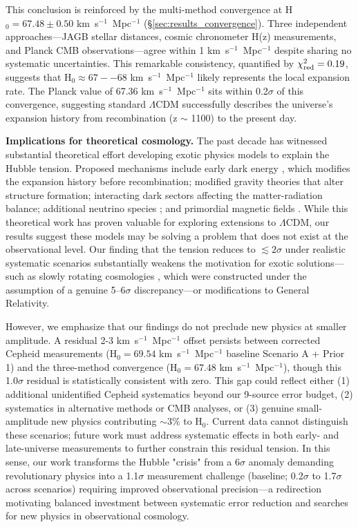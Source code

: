 \documentclass[preprint, linenumbers]{aastex701}
\begin{document}
This conclusion is reinforced by the multi-method convergence at H$_0 = 67.48 \pm 0.50$ km~s$^{-1}$~Mpc$^{-1}$ (\S\ref{sec:results_convergence}). Three independent approaches---JAGB stellar distances, cosmic chronometer H(z) measurements, and Planck CMB observations---agree within 1 km~s$^{-1}$~Mpc$^{-1}$ despite sharing no systematic uncertainties. This remarkable consistency, quantified by $\chi^2_{\rm red} = 0.19$, suggests that H$_0 \approx 67--68$ km~s$^{-1}$~Mpc$^{-1}$ likely represents the local expansion rate. The Planck value of 67.36 km~s$^{-1}$~Mpc$^{-1}$ sits within 0.2$\sigma$ of this convergence, suggesting standard $\Lambda$CDM successfully describes the universe's expansion history from recombination (z $\sim$ 1100) to the present day.

\textbf{Implications for theoretical cosmology.} The past decade has witnessed substantial theoretical effort developing exotic physics models to explain the Hubble tension. Proposed mechanisms include early dark energy \citep{Poulin2019}, which modifies the expansion history before recombination; modified gravity theories \citep{Marra2021} that alter structure formation; interacting dark sectors \citep{DiValentino2020} affecting the matter-radiation balance; additional neutrino species \citep{Anchordoqui2022}; and primordial magnetic fields \citep{Jedamzik2020}. While this theoretical work has proven valuable for exploring extensions to $\Lambda$CDM, our results suggest these models may be solving a problem that does not exist at the observational level. Our finding that the tension reduces to $\lesssim 2\sigma$ under realistic systematic scenarios substantially weakens the motivation for exotic solutions---such as slowly rotating cosmologies \citep{Szigeti2025}, which were constructed under the assumption of a genuine 5--6$\sigma$ discrepancy---or modifications to General Relativity.

However, we emphasize that our findings do not preclude new physics at smaller amplitude. A residual 2-3 km~s$^{-1}$~Mpc$^{-1}$ offset persists between corrected Cepheid measurements (H$_0 = 69.54$ km~s$^{-1}$~Mpc$^{-1}$ baseline Scenario A + Prior 1) and the three-method convergence (H$_0 = 67.48$ km~s$^{-1}$~Mpc$^{-1}$), though this 1.0$\sigma$ residual is statistically consistent with zero. This gap could reflect either (1) additional unidentified Cepheid systematics beyond our 9-source error budget, (2) systematics in alternative methods or CMB analyses, or (3) genuine small-amplitude new physics contributing $\sim$3\% to H$_0$. Current data cannot distinguish these scenarios; future work must address systematic effects in both early- and late-universe measurements to further constrain this residual tension. In this sense, our work transforms the Hubble "crisis" from a 6$\sigma$ anomaly demanding revolutionary physics into a 1.1$\sigma$ measurement challenge (baseline; 0.2$\sigma$ to 1.7$\sigma$ across scenarios) requiring improved observational precision---a redirection motivating balanced investment between systematic error reduction and searches for new physics in observational cosmology.
\end{document}
